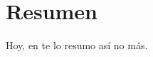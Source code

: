 \documentclass[12pt,letterpaper,openany]{book}
\begin{document}
\newpage
\listoffigures %

\newpage
\listoftables %

\chapter*{Resumen} %
Hoy, en te lo resumo así no más.

\end{document}
